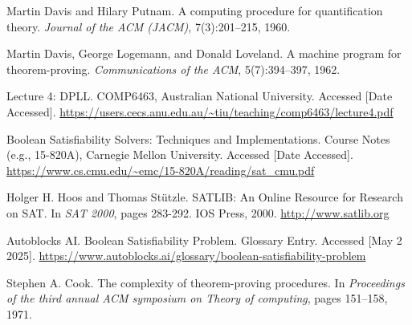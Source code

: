 \documentclass[12pt, a4paper]{article}
\begin{document}
\begin{thebibliography}{10}

Martin Davis and Hilary Putnam.
A computing procedure for quantification theory.
\emph{Journal of the ACM (JACM)}, 7(3):201–215, 1960.

Martin Davis, George Logemann, and Donald Loveland.
A machine program for theorem-proving.
\emph{Communications of the ACM}, 5(7):394–397, 1962.

Lecture 4: DPLL.
COMP6463, Australian National University.
Accessed [Date Accessed].
\url{https://users.cecs.anu.edu.au/~tiu/teaching/comp6463/lecture4.pdf}

Boolean Satisfiability Solvers: Techniques and Implementations.
Course Notes (e.g., 15-820A), Carnegie Mellon University.
Accessed [Date Accessed].
\url{https://www.cs.cmu.edu/~emc/15-820A/reading/sat_cmu.pdf}

Holger H. Hoos and Thomas Stützle.
SATLIB: An Online Resource for Research on SAT.
In \emph{SAT 2000}, pages 283-292. IOS Press, 2000.
\url{http://www.satlib.org} 

Autoblocks AI.
Boolean Satisfiability Problem.
Glossary Entry. Accessed [May 2 2025]. %
\url{https://www.autoblocks.ai/glossary/boolean-satisfiability-problem}

Stephen A. Cook.
The complexity of theorem-proving procedures.
In \emph{Proceedings of the third annual ACM symposium on Theory of computing}, pages 151–158, 1971.

\end{thebibliography}
\end{document}
